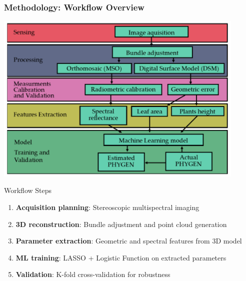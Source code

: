 \documentclass[aspectratio=43]{beamer}
\begin{document}

\begin{frame}
    \frametitle{Methodology: Workflow Overview}
    
    \begin{center}
        \includegraphics[width=0.9\textwidth]{Imgs/agronomy-14-00306-g003.png}
    \end{center}
    
    \begin{exampleblock}{Workflow Steps}
        \small
        \begin{enumerate}
            \item \textbf{Acquisition planning}: Stereoscopic multispectral imaging
            \item \textbf{3D reconstruction}: Bundle adjustment and point cloud generation
            \item \textbf{Parameter extraction}: Geometric and spectral features from 3D model
            \item \textbf{ML training}: LASSO + Logistic Function on extracted parameters
            \item \textbf{Validation}: K-fold cross-validation for robustness
        \end{enumerate}
    \end{exampleblock}
\end{frame}
\end{document}
